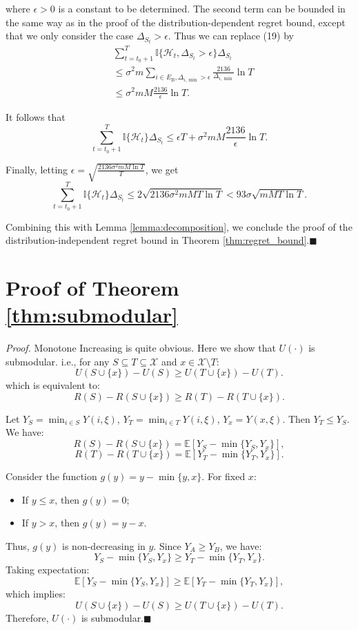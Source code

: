 \documentclass[opre,sglanonrev]{informs4}
\begin{document}
where $\epsilon>0$ is a constant to be determined. The second term can be bounded in the same way as in the proof of the distribution-dependent regret bound, except that we only consider the case $\Delta_{S_t}>\epsilon$. Thus we can replace (19) by
\begin{equation*}
	\begin{aligned}
		&\sum_{t=t_0+1}^T\mathbb{I}\{\mathcal{H}_t,\Delta_{S_t}>\epsilon\}\Delta_{S_t}\\
		&\leq \sigma^2m\sum_{i\in E_\mathrm{B},\Delta_{i,\min}>\epsilon}\frac{2136}{\Delta_{i,\min}}\ln T\\
		&\leq \sigma^2mM\frac{2136}{\epsilon}\ln T.
	\end{aligned}
\end{equation*}

It follows that
$$\sum_{t=t_0+1}^T\mathbb{I}\{\mathcal{H}_t\}\Delta_{S_t}\leq\epsilon T+\sigma^2mM\frac{2136}{\epsilon}\ln T.$$

Finally, letting $\epsilon=\sqrt{\frac{2136\sigma^2mM\ln T}{T}}$, we get 
$$\sum_{t=t_0+1}^T\mathbb{I}\{\mathcal{H}_t\}\Delta_{S_t}\leq2\sqrt{2136\sigma^2mMT\ln T}<93\sigma\sqrt{mMT\ln T}.$$

Combining this with Lemma \ref{lemma:decomposition}, we conclude the proof of the distribution-independent regret bound in Theorem \ref{thm:regret_bound}.\hfill $\blacksquare$

\section{Proof of Theorem \ref{thm:submodular}}
\textit{Proof.} Monotone Increasing is quite obvious. Here we show that $U(\cdot)$ is submodular. i.e., for any $S \subseteq T \subseteq \mathcal{X}$ and $x \in \mathcal{X} \setminus T$:
$$
U(S \cup \{x\}) - U(S) \geq U(T \cup \{x\}) - U(T).
$$
which is equivalent to:
$$
R(S)-R(S \cup \{x\}) \geq R(T) - R(T \cup \{x\}).
$$

Let $Y_S = \min_{i \in S} Y(i,\xi)$, $Y_T = \min_{i \in T} Y(i,\xi)$, $Y_x = Y(x,\xi)$. Then $Y_T \leq Y_S$. We have:
\[
R(S) - R(S \cup \{x\}) = \mathbb{E}\left[Y_S - \min\{Y_S, Y_x\}\right],
\]
\[
R(T) - R(T \cup \{x\}) = \mathbb{E}\left[Y_T - \min\{Y_T, Y_x\}\right].
\]

Consider the function $g(y) = y - \min\{y, x\}$. For fixed $x$:
\begin{itemize}
    \item If $y \leq x$, then $g(y) = 0$;
    \item If $y > x$, then $g(y) = y - x$.
\end{itemize}
Thus, $g(y)$ is non-decreasing in $y$. Since $Y_A \geq Y_B$, we have:
\[
Y_S - \min\{Y_S, Y_x\} \geq Y_T - \min\{Y_T, Y_x\}.
\]
Taking expectation:
\[
\mathbb{E}\left[Y_S - \min\{Y_S, Y_x\}\right] \geq \mathbb{E}\left[Y_T - \min\{Y_T, Y_x\}\right],
\]
which implies:
$$
U(S \cup \{x\}) - U(S) \geq U(T \cup \{x\}) - U(T).
$$
Therefore, $U(\cdot)$ is submodular.\hfill $\blacksquare$

\end{document}
